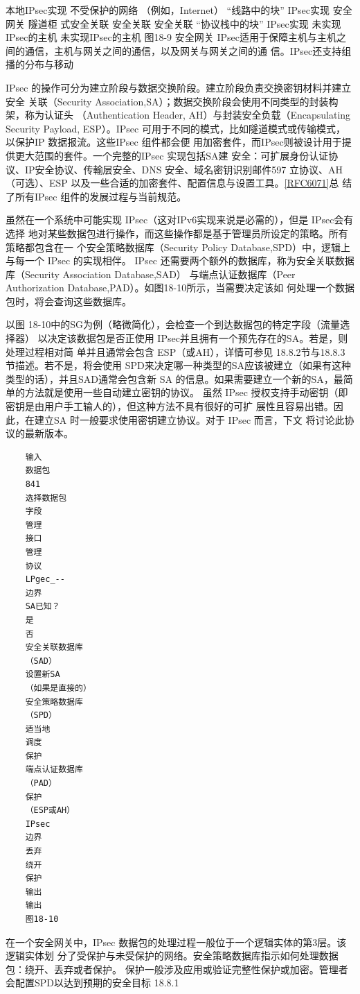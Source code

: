 本地IPsec实现
不受保护的网络
（例如，Internet）
“线路中的块”
IPsec实现
安全网关
隧道柜
式安全关联
安全关联
安全关联
“协议栈中的块”
IPsec实现
未实现IPsec的主机
未实现IPsec的主机
图18-9
安全网关
IPsec适用于保障主机与主机之间的通信，主机与网关之间的通信，以及网关与网关之间的通
信。IPsec还支持组播的分布与移动

IPsec 的操作可分为建立阶段与数据交换阶段。建立阶段负责交换密钥材料并建立安全
关联（Security Association,SA）；数据交换阶段会使用不同类型的封装构架，称为认证头
（Authentication Header, AH）与封装安全负载（Encapsulating Security Payload, ESP）。IPsec
可用于不同的模式，比如隧道模式或传输模式，以保护IP 数据报流。这些IPsec 组件都会便
用加密套件，而IPsec则被设计用于提供更大范围的套件。一个完整的IPsec 实现包括SA建
安全：可扩展身份认证协议、IP安全协议、传輸层安全、DNS 安全、域名密钥识别邮件597
立协议、AH（可选）、ESP 以及一些合适的加密套件、配置信息与设置工具。\href{https://www.rfc-editor.org/rfc/rfc6071}{[RFC6071]}总
结了所有IPsec 组件的发展过程与当前规范。

虽然在一个系统中可能实现 IPsec（这对IPv6实现来说是必需的），但是 IPsec会有选择
地对某些数据包进行操作，而这些操作都是基于管理员所设定的策略。所有策略都包含在一
个安全策略数据库（Security Policy Database,SPD）中，逻辑上与每一个 IPsec 的实现相伴。
IPsec 还需要两个额外的数据库，称为安全关联数据库（Security Association Database,SAD）
与端点认证数据库（Peer Authorization Database,PAD）。如图18-10所示，当需要决定该如
何处理一个数据包时，将会查询这些数据库。

以图 18-10中的SG为例（略微简化），会检查一个到达数据包的特定字段（流量选择器）
以决定该数据包是否正使用 IPsec并且拥有一个预先存在的SA。若是，则处理过程相对简
单并且通常会包含 ESP（或AH），详情可参见 18.8.2节与18.8.3节描述。若不是，将会使用
SPD来决定哪一种类型的SA应该被建立（如果有这种类型的话），并且SAD通常会包含新
SA 的信息。如果需要建立一个新的SA，最简单的方法就是使用一些自动建立密钥的协议。
虽然 IPsec 授权支持手动密钥（即密钥是由用户手工输人的），但这种方法不具有很好的可扩
展性且容易出错。因此，在建立SA 时一般要求使用密钥建立协议。对于 IPsec 而言，下文
将讨论此协议的最新版本。
\begin{verbatim}
    输入
    数据包
    841
    选择数据包
    字段
    管理
    接口
    管理
    协议
    LPgec_--
    边界
    SA已知？
    是
    否
    安全关联数据库
    （SAD）
    设置新SA
    （如果是直接的）
    安全策略数据库
    （SPD）
    适当地
    调度
    保护
    端点认证数据库
    （PAD）
    保护
    （ESP或AH）
    IPsec
    边界
    丢弃
    绕开
    保护
    输出
    输出
    图18-10
\end{verbatim}
在一个安全网关中，IPsec 数据包的处理过程一般位于一个逻辑实体的第3层。该逻辑实体划
分了受保护与未受保护的网络。安全策略数据库指示如何处理数据包：绕开、丢弃或者保护。
保护一般涉及应用或验证完整性保护或加密。管理者会配置SPD以达到预期的安全目标
18.8.1

